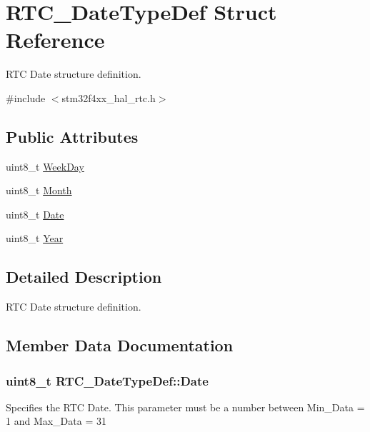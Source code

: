 \hypertarget{struct_r_t_c___date_type_def}{}\section{R\+T\+C\+\_\+\+Date\+Type\+Def Struct Reference}
\label{struct_r_t_c___date_type_def}


R\+TC Date structure definition.  




{\ttfamily \#include $<$stm32f4xx\+\_\+hal\+\_\+rtc.\+h$>$}

\subsection*{Public Attributes}
\begin{DoxyCompactItemize}
\item 
uint8\+\_\+t \hyperlink{struct_r_t_c___date_type_def_aff0238fae9aa5fe6dc30ca2833878e45}{Week\+Day}
\item 
uint8\+\_\+t \hyperlink{struct_r_t_c___date_type_def_a3df66a922683acd4db5defe402c664a0}{Month}
\item 
uint8\+\_\+t \hyperlink{struct_r_t_c___date_type_def_a5c81723966bbed4ce8fbe68d1b590c8a}{Date}
\item 
uint8\+\_\+t \hyperlink{struct_r_t_c___date_type_def_a1e7d226d1da13713b7d6bbd18c00bd9b}{Year}
\end{DoxyCompactItemize}


\subsection{Detailed Description}
R\+TC Date structure definition. 

\subsection{Member Data Documentation}
\subsubsection[{\texorpdfstring{Date}{Date}}]{\setlength{\rightskip}{0pt plus 5cm}uint8\+\_\+t R\+T\+C\+\_\+\+Date\+Type\+Def\+::\+Date}\hypertarget{struct_r_t_c___date_type_def_a5c81723966bbed4ce8fbe68d1b590c8a}{}\label{struct_r_t_c___date_type_def_a5c81723966bbed4ce8fbe68d1b590c8a}
Specifies the R\+TC Date. This parameter must be a number between Min\+\_\+\+Data = 1 and Max\+\_\+\+Data = 31 
